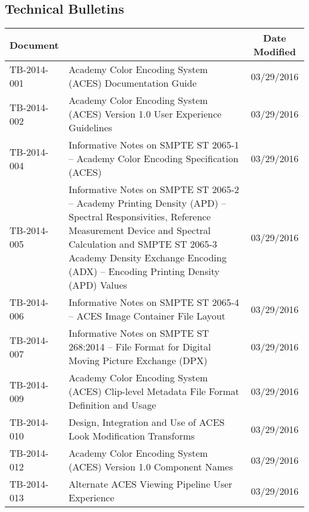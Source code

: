 \documentclass[10pt]{academydoc}
\begin{document}
\subsection*{Technical Bulletins}
\begin{tabularx}{\linewidth}{|l X|c|}
\hline
\textbf{Document} & & \textbf{Date Modified} \\ \hline
TB-2014-001 & Academy Color Encoding System (ACES) Documentation Guide & 03/29/2016 \\ \hline
TB-2014-002 & Academy Color Encoding System (ACES) Version 1.0 User Experience Guidelines & 03/29/2016 \\ \hline
TB-2014-004 & Informative Notes on SMPTE ST 2065-1 -- Academy Color Encoding Specification (ACES) & 03/29/2016 \\ \hline
TB-2014-005 & Informative Notes on SMPTE ST 2065-2 -- Academy Printing Density (APD) -- Spectral Responsivities, Reference Measurement Device and Spectral Calculation and SMPTE ST 2065-3 Academy Density Exchange Encoding (ADX) -- Encoding Printing Density (APD) Values & 03/29/2016 \\ \hline
TB-2014-006 & Informative Notes on SMPTE ST 2065-4 -- ACES Image Container File Layout & 03/29/2016 \\ \hline
TB-2014-007 & Informative Notes on SMPTE ST 268:2014 -- File Format for Digital Moving Picture Exchange (DPX) & 03/29/2016 \\ \hline
TB-2014-009 & Academy Color Encoding System (ACES) Clip-level Metadata File Format Definition and Usage & 03/29/2016 \\ \hline
TB-2014-010 & Design, Integration and Use of ACES Look Modification Transforms & 03/29/2016 \\ \hline
TB-2014-012 & Academy Color Encoding System (ACES) Version 1.0 Component Names & 03/29/2016 \\ \hline
TB-2014-013 & Alternate ACES Viewing Pipeline User Experience & 03/29/2016 \\ \hline
\end{tabularx}
\end{document}
